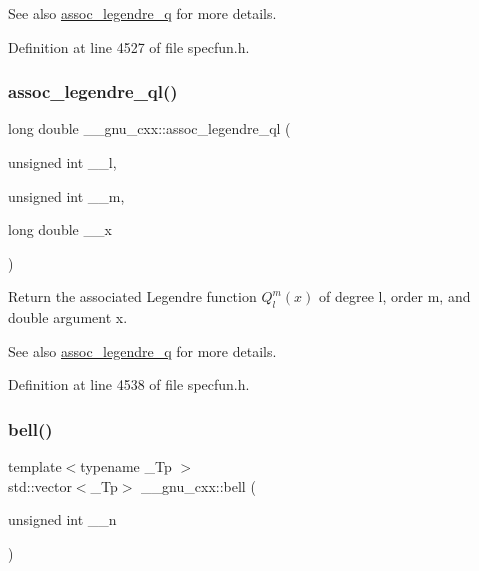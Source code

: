 \begin{DoxySeeAlso}{See also}
\hyperlink{group__mathsf__gnu_ga96a1223727fa71ffbf520a98ac3dc885}{assoc\+\_\+legendre\+\_\+q} for more details. 
\end{DoxySeeAlso}


Definition at line 4527 of file specfun.\+h.

\mbox{\label{group__mathsf__gnu_ga07a9e571759c6d24e96da8cc8268f91e}} 
\subsubsection{\texorpdfstring{assoc\+\_\+legendre\+\_\+ql()}{assoc\_legendre\_ql()}}
{\footnotesize\ttfamily long double \+\_\+\+\_\+gnu\+\_\+cxx\+::assoc\+\_\+legendre\+\_\+ql (\begin{DoxyParamCaption}\item[{unsigned int}]{\+\_\+\+\_\+l,  }\item[{unsigned int}]{\+\_\+\+\_\+m,  }\item[{long double}]{\+\_\+\+\_\+x }\end{DoxyParamCaption})\hspace{0.3cm}{\ttfamily [inline]}}

Return the associated Legendre function $ Q_l^m(x) $ of degree {\ttfamily l}, order {\ttfamily m}, and { double} argument {\ttfamily x}.

\begin{DoxySeeAlso}{See also}
\hyperlink{group__mathsf__gnu_ga96a1223727fa71ffbf520a98ac3dc885}{assoc\+\_\+legendre\+\_\+q} for more details. 
\end{DoxySeeAlso}


Definition at line 4538 of file specfun.\+h.

\mbox{\label{group__mathsf__gnu_gac07286d722248a7f3c65a13b49b1fef5}} 
\subsubsection{\texorpdfstring{bell()}{bell()}\hspace{0.1cm}{\footnotesize\ttfamily [1/2]}}
{\footnotesize\ttfamily template$<$typename \+\_\+\+Tp $>$ \\
std\+::vector$<$\+\_\+\+Tp$>$ \+\_\+\+\_\+gnu\+\_\+cxx\+::bell (\begin{DoxyParamCaption}\item[{unsigned int}]{\+\_\+\+\_\+n }\end{DoxyParamCaption})\hspace{0.3cm}{\ttfamily [inline]}}

